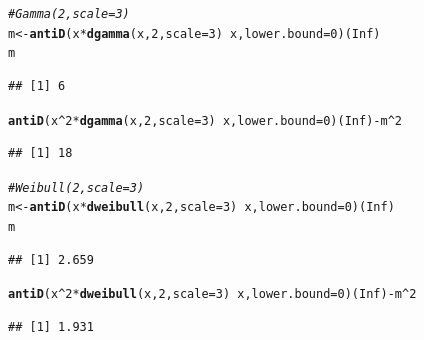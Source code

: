 \documentclass[twoside]{book}\usepackage[]{graphicx}\usepackage[]{xcolor}
\makeatletter
\newcommand{\hlnum}[1]{\textcolor[rgb]{0.686,0.059,0.569}{#1}}%
\newcommand{\hlcom}[1]{\textcolor[rgb]{0.678,0.584,0.686}{\textit{#1}}}%
\newcommand{\hlopt}[1]{\textcolor[rgb]{0,0,0}{#1}}%
\newcommand{\hlstd}[1]{\textcolor[rgb]{0.345,0.345,0.345}{#1}}%
\newcommand{\hlkwb}[1]{\textcolor[rgb]{0.69,0.353,0.396}{#1}}%
\newcommand{\hlkwc}[1]{\textcolor[rgb]{0.333,0.667,0.333}{#1}}%
\newcommand{\hlkwd}[1]{\textcolor[rgb]{0.737,0.353,0.396}{\textbf{#1}}}%
\newenvironment{kframe}{%
 \def\at@end@of@kframe{}%
 \ifinner\ifhmode%
  \def\at@end@of@kframe{\end{minipage}}%
  \begin{minipage}{\columnwidth}%
 \fi\fi%
 \def\FrameCommand##1{\hskip\@totalleftmargin \hskip-\fboxsep
 \colorbox{shadecolor}{##1}\hskip-\fboxsep
     \hskip-\linewidth \hskip-\@totalleftmargin \hskip\columnwidth}%
 \MakeFramed {\advance\hsize-\width
   \@totalleftmargin\z@ \linewidth\hsize
   \@setminipage}}%
 {\par\unskip\endMakeFramed%
 \at@end@of@kframe}
\newenvironment{knitrout}{}{} %
\makeatother
\begin{document}
\begin{solution}
\begin{knitrout}
\begin{kframe}
\begin{alltt}
\hlcom{# Gamma(2,scale = 3)}
\hlstd{m} \hlkwb{<-} \hlkwd{antiD}\hlstd{( x} \hlopt{*} \hlkwd{dgamma}\hlstd{(x,}\hlnum{2}\hlstd{,}\hlkwc{scale} \hlstd{=} \hlnum{3}\hlstd{)} \hlopt{~} \hlstd{x,} \hlkwc{lower.bound} \hlstd{=} \hlnum{0}\hlstd{)(}\hlnum{Inf}\hlstd{)}
\hlstd{m}
\end{alltt}
\begin{verbatim}
## [1] 6
\end{verbatim}
\begin{alltt}
\hlkwd{antiD}\hlstd{( x}\hlopt{^}\hlnum{2} \hlopt{*} \hlkwd{dgamma}\hlstd{(x,}\hlnum{2}\hlstd{,}\hlkwc{scale} \hlstd{=} \hlnum{3}\hlstd{)} \hlopt{~} \hlstd{x,} \hlkwc{lower.bound} \hlstd{=} \hlnum{0} \hlstd{)(}\hlnum{Inf}\hlstd{)} \hlopt{-} \hlstd{m}\hlopt{^}\hlnum{2}
\end{alltt}
\begin{verbatim}
## [1] 18
\end{verbatim}
\end{kframe}
\end{knitrout}
\begin{knitrout}
\color{fgcolor}\begin{kframe}
\begin{alltt}
\hlcom{# Weibull(2,scale = 3)}
\hlstd{m} \hlkwb{<-} \hlkwd{antiD}\hlstd{( x} \hlopt{*} \hlkwd{dweibull}\hlstd{(x,}\hlnum{2}\hlstd{,}\hlkwc{scale} \hlstd{=} \hlnum{3}\hlstd{)} \hlopt{~} \hlstd{x,} \hlkwc{lower.bound} \hlstd{=} \hlnum{0}\hlstd{)(}\hlnum{Inf}\hlstd{)}
\hlstd{m}
\end{alltt}
\begin{verbatim}
## [1] 2.659
\end{verbatim}
\begin{alltt}
\hlkwd{antiD}\hlstd{( x}\hlopt{^}\hlnum{2} \hlopt{*} \hlkwd{dweibull}\hlstd{(x,}\hlnum{2}\hlstd{,}\hlkwc{scale} \hlstd{=} \hlnum{3}\hlstd{)} \hlopt{~} \hlstd{x,} \hlkwc{lower.bound} \hlstd{=} \hlnum{0} \hlstd{)(}\hlnum{Inf}\hlstd{)} \hlopt{-} \hlstd{m}\hlopt{^}\hlnum{2}
\end{alltt}
\begin{verbatim}
## [1] 1.931
\end{verbatim}
\end{kframe}
\end{knitrout}
\end{solution}
\end{document}
